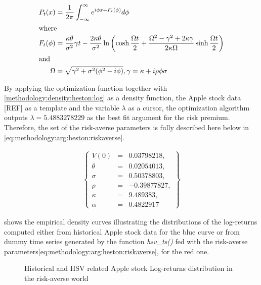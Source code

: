 \documentclass[12pt]{report}
\begin{document}
\begin{align}
P_t(x) &= \frac{1}{2 \pi} \int_{-\infty}^{\infty} e^{i \phi x + F_t(\phi)} d\phi \label{methodology:density:heston:log} \\
\intertext{where}
F_t(\phi) &= \frac{\kappa \theta}{\sigma^2} \gamma t -
  \frac{2 \kappa \theta}{\sigma ^2} \ln\left(
    \cosh \frac{\Omega t}{2} +
    \frac{\Omega^2 - \gamma^2 +2 \kappa \gamma}{2 \kappa \Omega} \sinh \frac{\Omega t}{2}
  \right) \notag \\
\intertext{and}
\Omega &= \sqrt{\gamma^2 + \sigma^2 (\phi^2 - i\phi)}, \notag
\gamma = \kappa + i \rho \phi \sigma \notag
\end{align}

By applying the optimization function together with \cref{methodology:density:heston:log} as a density function, the Apple stock data [REF] as a template and the variable $\lambda$ as a cursor, the optimization algorithm outputs $\lambda = 5.4883278229$ as the best fit argument for the risk premium.
Therefore, the set of the risk-averse parameters is fully described here below in \ref{eq:methodology:arg:heston:riskaverse}.

\begin{align}
  \left \{
  \begin{array}{lcl}
    V(0) &= &0.03798218, \\
    \theta &= &0.02054013, \\
    \sigma &= &0.50378803, \\
    \rho &= &-0.39877827, \\
    \kappa &= &9.489383, \\
    \alpha & = &0.4822917
  \end{array}
  \right \}  
  \label{eq:methodology:arg:heston:riskaverse}
\end{align}


 shows the empirical density curves illustrating the distributions of the log-returns computed either from historical Apple stock data for the blue curve or from dummy time series generated by the function \textit{hsv\_ts()} fed with the risk-averse parameters\ref{eq:methodology:arg:heston:riskaverse}, for the red one.


\begin{figure}[ht]
  \centering
  
  \caption{Historical and HSV related Apple stock Log-returns distribution in the risk-averse world}
  \label{p:methodology:density:aapl:heston:riskaverse}
\end{figure}
\end{document}
